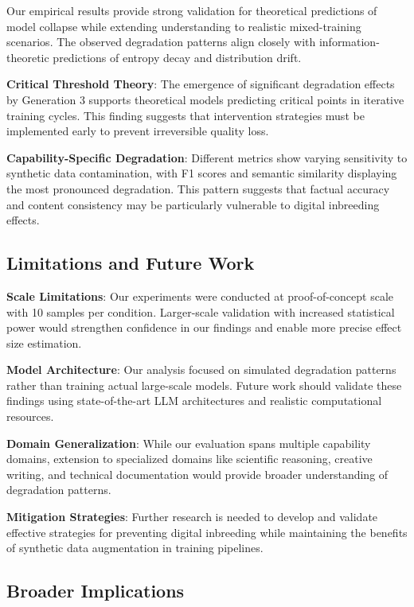 \documentclass{article}
\begin{document}
Our empirical results provide strong validation for theoretical predictions of model collapse \cite{shumailov2023curse} while extending understanding to realistic mixed-training scenarios. The observed degradation patterns align closely with information-theoretic predictions of entropy decay and distribution drift.

\textbf{Critical Threshold Theory}: The emergence of significant degradation effects by Generation 3 supports theoretical models predicting critical points in iterative training cycles. This finding suggests that intervention strategies must be implemented early to prevent irreversible quality loss.

\textbf{Capability-Specific Degradation}: Different metrics show varying sensitivity to synthetic data contamination, with F1 scores and semantic similarity displaying the most pronounced degradation. This pattern suggests that factual accuracy and content consistency may be particularly vulnerable to digital inbreeding effects.

\subsection{Limitations and Future Work}

\textbf{Scale Limitations}: Our experiments were conducted at proof-of-concept scale with 10 samples per condition. Larger-scale validation with increased statistical power would strengthen confidence in our findings and enable more precise effect size estimation.

\textbf{Model Architecture}: Our analysis focused on simulated degradation patterns rather than training actual large-scale models. Future work should validate these findings using state-of-the-art LLM architectures and realistic computational resources.

\textbf{Domain Generalization}: While our evaluation spans multiple capability domains, extension to specialized domains like scientific reasoning, creative writing, and technical documentation would provide broader understanding of degradation patterns.

\textbf{Mitigation Strategies}: Further research is needed to develop and validate effective strategies for preventing digital inbreeding while maintaining the benefits of synthetic data augmentation in training pipelines.

\subsection{Broader Implications}
\end{document}
